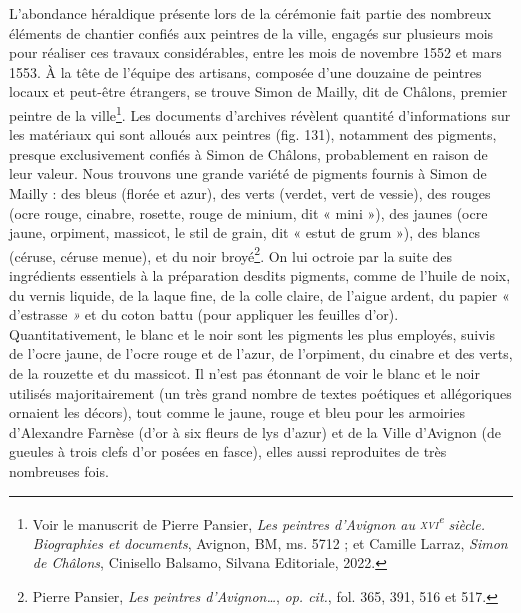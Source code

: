 \documentclass[12pt,twoside,openany]{book}
\begin{document}
L’abondance héraldique présente lors de la cérémonie fait partie des nombreux éléments de chantier confiés aux peintres de la ville, engagés sur plusieurs mois pour réaliser ces travaux considérables, entre les mois de novembre 1552 et mars 1553. À la tête de l’équipe des artisans, composée d’une douzaine de peintres locaux et peut-être étrangers, se trouve Simon de Mailly, dit de Châlons, premier peintre de la ville\footnote{Voir le manuscrit de Pierre Pansier, \textit{Les peintres d’Avignon au }\textit{\textsc{xvi}}\textit{\textsuperscript{e}}\textit{ siècle. Biographies et documents}, Avignon, BM, ms. 5712 ; et Camille Larraz, \textit{Simon de Châlons}, Cinisello Balsamo, Silvana Editoriale, 2022.}. Les documents d’archives révèlent quantité d’informations sur les matériaux qui sont alloués aux peintres (fig. 131), notamment des pigments, presque exclusivement confiés à Simon de Châlons, probablement en raison de leur valeur. Nous trouvons une grande variété de pigments fournis à Simon de Mailly : des bleus (florée et azur), des verts (verdet, vert de vessie), des rouges (ocre rouge, cinabre, rosette, rouge de minium, dit « mini »), des jaunes (ocre jaune, orpiment, massicot, le stil de grain, dit « estut de grum »), des blancs (céruse, céruse menue), et du noir broyé\footnote{Pierre Pansier, \textit{Les peintres d’Avignon…},\textit{ op. cit.}, fol. 365, 391, 516 et 517.}. On lui octroie par la suite des ingrédients essentiels à la préparation desdits pigments, comme de l’huile de noix, du vernis liquide, de la laque fine, de la colle claire, de l’aigue ardent, du papier « d’estrasse\textit{ »} et du coton battu (pour appliquer les feuilles d’or). Quantitativement, le blanc et le noir sont les pigments les plus employés, suivis de l’ocre jaune, de l’ocre rouge et de l’azur, de l’orpiment, du cinabre et des verts, de la rouzette et du massicot. Il n’est pas étonnant de voir le blanc et le noir utilisés majoritairement (un très grand nombre de textes poétiques et allégoriques ornaient les décors), tout comme le jaune, rouge et bleu pour les armoiries d’Alexandre Farnèse (d’or à six fleurs de lys d’azur) et de la Ville d’Avignon (de gueules à trois clefs d’or posées en fasce), elles aussi reproduites de très nombreuses fois.
\end{document}

